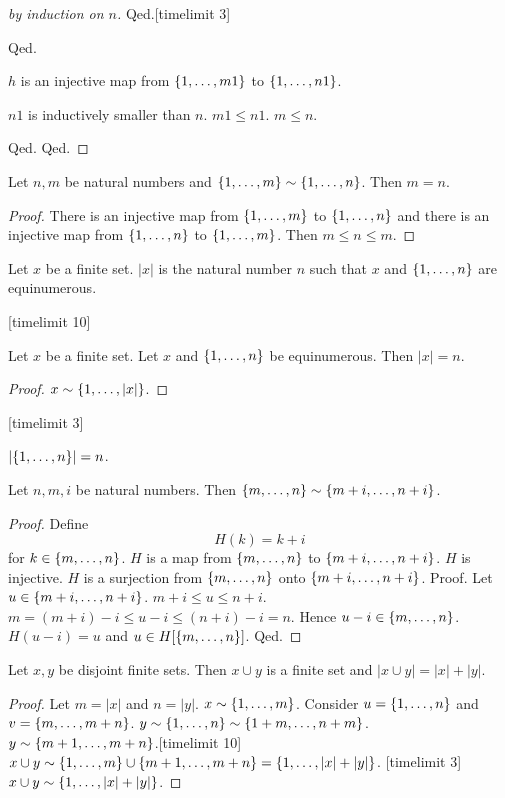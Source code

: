 \documentclass{article}
\begin{document}
\begin{forthel}
\begin{proof}[by induction on $n$]
Qed.[timelimit 3]

Qed.




$h$ is an injective map from $\{1,\dots,m1\}$ to $\{1,\dots,n1\}$. 

$n1$ is inductively smaller than $n$.
$m1 \leq n1$. $m \leq n$.

Qed.
Qed.
\end{proof}


\begin{lemma}
Let $n,m$ be natural numbers and
$\{1,\dots,m\} \sim \{1,\dots,n\}$. Then $m = n$.
\end{lemma}
\begin{proof}
There is an injective map from 
$\{1,\dots,m\}$ to $\{1,\dots,n\}$ and
there is an injective map from 
$\{1,\dots,n\}$ to $\{1,\dots,m\}$. Then $m \leq n \leq m$.
\end{proof}

\begin{signature}
Let $x$ be a finite set. $|x|$ is the natural number $n$
such that $x$ and $\{1,\dots,n\}$ are equinumerous.
\end{signature}

[timelimit 10]
\begin{lemma} Let $x$ be a finite set.
Let $x$ and $\{1,\dots,n\}$ be equinumerous. Then
$|x| = n$.
\end{lemma}
\begin{proof}
$x \sim \{1,\dots,|x|\}$.
\end{proof}[timelimit 3]

\begin{lemma}
$|\{1,\dots,n\}| = n$.
\end{lemma}

\begin{lemma}
Let $n,m,i$ be natural numbers.
Then $\{m,\dots,n\} \sim \{m+i,\dots,n+i\}$.
\end{lemma}
\begin{proof}
Define \[ H(k) = k + i \]
        for $k \in \{m,\dots,n\}$.
$H$ is a map from $\{m,\dots,n\}$ to $\{m+i,\dots,n+i\}$.
$H$ is injective.
$H$ is a surjection from $\{m,\dots,n\}$ onto $\{m+i,\dots,n+i\}$.
Proof.
Let $u \in \{m+i,\dots,n+i\}$. $m + i \leq u \leq n + i$.
$m  = (m + i) - i \leq u - i \leq (n + i) - i = n$.
Hence $u - i \in \{m,\dots,n\}$. $H(u-i) = u$ and 
$u \in H[\{m,\dots,n\}]$.
Qed.
\end{proof}

\begin{lemma}
Let $x,y$ be disjoint finite sets.
Then $x \cup y$ is a finite set and $|x \cup y| = |x| + |y|$.
\end{lemma}
\begin{proof}
Let $m = |x|$ and $n = |y|$.
$x \sim \{1,\dots,m\}$.
Consider $u = \{1,\dots,n\}$ and $v = \{m,\dots,m+n\}$. 
$y \sim \{1,\dots,n\} \sim \{1+m,\dots,n+m\}$.
$y \sim \{m+1,\dots,m+n\}$.[timelimit 10]
$x \cup y \sim \{1,\dots,m\} \cup \{m+1,\dots,m+n\} = \{1,\dots,|x|+|y|\}$. [timelimit 3]
$x \cup y \sim \{1,\dots,|x|+|y|\}$.
\end{proof}



\end{forthel}
\end{document}
